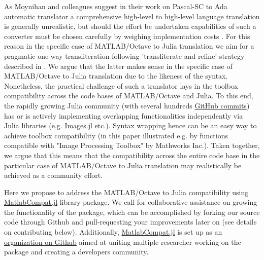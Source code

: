 As Moynihan and colleagues suggest in their work on Pascal-SC to Ada automatic translator a comprehensive high-level to high-level language translation is generally unrealistic, but should the effort be undertaken capabilities of such a converter must be chosen carefully by weighing implementation costs \cite{Moynihan_1991}. For this reason in the specific case of MATLAB/Octave to Julia translation we aim for a pragmatic one-way transliteration following 'transliterate and refine' strategy described in \cite{Waters_1988}. We argue that the latter makes sense in the specific case of MATLAB/Octave to Julia translation due to the likeness of the syntax. Nonetheless, the practical challenge of such a translator lays in the toolbox compatibility across the code bases of MATLAB/Octave and Julia. To this end, the rapidly growing Julia community (with several hundreds \href{https://github.com/JuliaLang/METADATA.jl/graphs/commit-activity}{GitHub commits}) has or is actively implementing overlapping functionalities independently via Julia libraries (e.g. \href{https://github.com/timholy/Images.jl}{Images.jl} etc.). Syntax wrapping hence can be an easy way to achieve toolbox compatibility (in this paper illustrated e.g. by functions compatible with "Image Processing Toolbox" by Mathworks Inc.). Taken together, we argue that this means that the compatibility across the entire code base in the particular case of MATLAB/Octave to Julia translation may realistically be achieved as a community effort.

Here we propose to address the MATLAB/Octave to Julia compatibility using \href{https://github.com/MatlabCompat/MatlabCompat.jl}{MatlabCompat.jl} library package. We call for collaborative assistance on growing the functionality of the package, which can be accomplished by forking our source code through Github and pull-requesting your improvements later on (see details on contributing below). Additionally, \href{http://matlabcompat.github.io/}{MatlabCompat.jl} is set up as an \href{https://github.com/MatlabCompat}{organization on Github} aimed at uniting multiple researcher working on the package and creating a developers community.
  
  
  
  
  